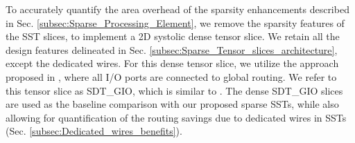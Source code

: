 \begin{table}[t]
\vspace{-0.30cm}
\centering
\caption{Area and freq. of SST \emph{vs.} SDT\_GIO slices (post PnR).}

\setlength\tabcolsep{2.5pt}
\renewcommand{\arraystretch}{1.0}

\label{tb:SST_delay_area_vs_SDT_GIO}

\vspace{-0.55cm}

\end{table}



To accurately quantify the area overhead of the sparsity enhancements described in Sec. \ref{subsec:Sparse_Processing_Element}, we remove the sparsity features of the SST slices, to implement a 2D systolic dense tensor slice.
We retain all the design features delineated in Sec. \ref{subsec:Sparse_Tensor_slices_architecture}, except the dedicated wires.
For this dense tensor slice, we utilize the approach proposed in \cite{TS_Aman_FPGA_2021, Aman_TS_TRETS_2022}, where all I/O ports are connected to global routing.
We refer to this tensor slice as SDT\_GIO, which is similar to \cite{TS_Aman_FPGA_2021, Aman_TS_TRETS_2022}.
The dense SDT\_GIO slices are used as the baseline comparison with our proposed sparse SSTs, while also allowing for quantification of the routing savings due to dedicated wires in SSTs 
(Sec. \ref{subsec:Dedicated_wires_benefits}).




